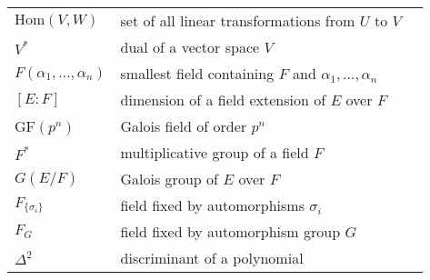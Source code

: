 \begin{center}
\begin{longtable}{llr}
%
$\mbox{Hom}(V, W)$ & set of all linear transformations from $U$ to $V$ & \pageref{noteHom} \\
%
$V^\ast$ & dual of a vector space $V$ & \pageref{notedual} \\
%
$F( \alpha_1, \ldots, \alpha_n)$ & smallest field containing $F$ and $\alpha_1, \ldots, \alpha_n$ & \pageref{notefieldcont}\\
%
$[E:F]$ & dimension of a field extension of $E$ over $F$ & \pageref{notedegext} \\
%
GF$(p^n)$ & Galois field of order $p^n$ & \pageref{galoisfield} \\
%
$F^*$ & multiplicative group of a field $F$ & \pageref{ntmultgrp} \\
%
$G(E/F)$ & Galois group of $E$ over $F$ &\pageref{notegalois} \\
%
$F_{\{\sigma_i \}}$ & field fixed by automorphisms $\sigma_i$ & \pageref{noteFixedfield} \\
%
$F_G$ & field fixed by automorphism group $G$ & \pageref{noteFixedG} \\
%
$\Delta^2$ & discriminant of a polynomial & \pageref{discriminant}
%
\end{longtable}
\end{center}




